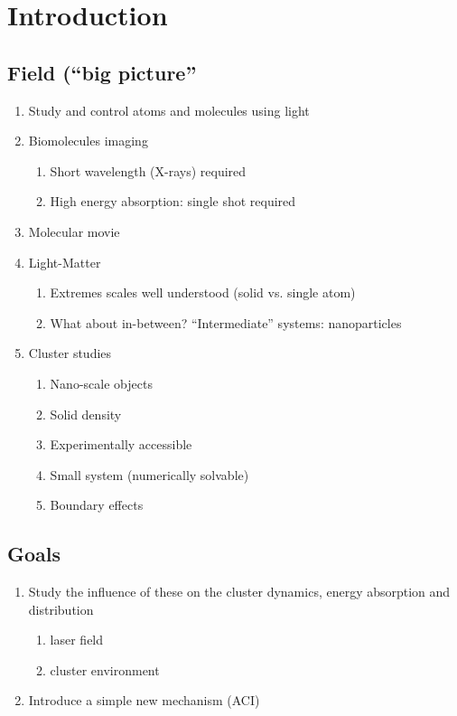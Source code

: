 \section{Introduction}

\subsection{Field (``big picture''}

\begin{enumerate}
\item Study and control atoms and molecules using light
\item Biomolecules imaging
    \begin{enumerate}
        \item Short wavelength (X-rays) required
        \item High energy absorption: single shot required
    \end{enumerate}
\item Molecular movie
\item Light-Matter
    \begin{enumerate}
        \item Extremes scales well understood (solid vs. single atom)
        \item What about in-between? “Intermediate” systems: nanoparticles
    \end{enumerate}
\item Cluster studies
    \begin{enumerate}
        \item Nano-scale objects
        \item Solid density
        \item Experimentally accessible
        \item Small system (numerically solvable)
        \item Boundary effects
    \end{enumerate}
\end{enumerate}




\subsection{Goals}
\begin{enumerate}
\item Study the influence of these on the cluster dynamics, energy absorption and distribution
\begin{enumerate}
    \item laser field
    \item cluster environment
    \end{enumerate}
\item Introduce a simple new mechanism (ACI)
\end{enumerate}





